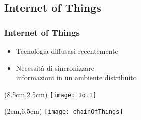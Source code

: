\subsection{Internet of Things}
\begin{frame}
 \frametitle{Internet of Things}

 \begin{itemize}
  \item<1-> Tecnologia diffusasi recentemente
  \item<2-> Necessit\`a di sincronizzare \\ informazioni in un ambiente
distribuito
 \end{itemize}

 \begin{textblock*}{5cm}(8.5cm,2.5cm)
  \texttt{[image: Iot1]}
 \end{textblock*}
 
 \begin{textblock*}{5cm}(2cm,6.5cm)
  \texttt{[image: chainOfThings]}
 \end{textblock*}

\end{frame}